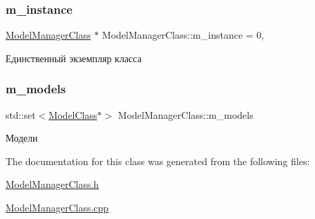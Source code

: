 \subsubsection{\texorpdfstring{m\+\_\+instance}{m\_instance}}
{\footnotesize\ttfamily \hyperlink{class_model_manager_class}{Model\+Manager\+Class} $\ast$ Model\+Manager\+Class\+::m\+\_\+instance = 0\hspace{0.3cm}{\ttfamily [static]}, {\ttfamily [private]}}



Единственный экземпляр класса 

\mbox{\label{class_model_manager_class_a109a3dfae693a84bdcc6f9ad699485bf}} 
\subsubsection{\texorpdfstring{m\+\_\+models}{m\_models}}
{\footnotesize\ttfamily std\+::set$<$\hyperlink{class_model_class}{Model\+Class}$\ast$$>$ Model\+Manager\+Class\+::m\+\_\+models\hspace{0.3cm}{\ttfamily [private]}}



Модели 



The documentation for this class was generated from the following files\+:\begin{DoxyCompactItemize}
\item 
\hyperlink{_model_manager_class_8h}{Model\+Manager\+Class.\+h}\item 
\hyperlink{_model_manager_class_8cpp}{Model\+Manager\+Class.\+cpp}\end{DoxyCompactItemize}
